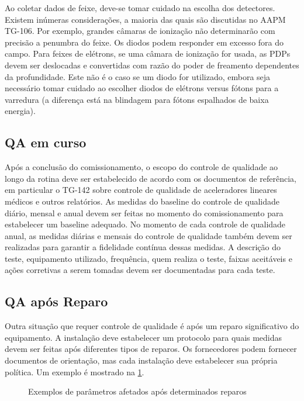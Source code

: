 \documentclass[11pt,a4paper]{article}
\newcounter{exemplo}
\begin{document}
	Ao coletar dados de feixe, deve-se tomar cuidado na escolha dos detectores. Existem inúmeras considerações, a maioria das quais são discutidas no AAPM TG-106. Por exemplo, grandes câmaras de ionização não determinarão com precisão a penumbra do feixe. Os diodos podem responder em excesso fora do campo. Para feixes de elétrons, se uma câmara de ionização for usada, as PDPs devem ser deslocadas e convertidas com razão do poder de freamento dependentes da profundidade. Este não é o caso se um diodo for utilizado, embora seja necessário tomar cuidado ao escolher diodos de elétrons versus fótons para a varredura (a diferença está na blindagem para fótons espalhados de baixa energia).

\subsection*{QA em curso}

	Após a conclusão do comissionamento, o escopo do controle de qualidade ao longo da rotina deve ser estabelecido de acordo com os documentos de referência, em particular o TG-142 sobre controle de qualidade de aceleradores lineares médicos e outros relatórios. As medidas do baseline do controle de qualidade diário, mensal e anual devem ser feitas no momento do comissionamento para estabelecer um baseline adequado. No momento de cada controle de qualidade anual, as medidas diárias e mensais do controle de qualidade também devem ser realizadas para garantir a fidelidade contínua dessas medidas. A descrição do teste, equipamento utilizado, frequência, quem realiza o teste, faixas aceitáveis e ações corretivas a serem tomadas devem ser documentadas para cada teste.

\subsection*{QA após Reparo}

	Outra situação que requer controle de qualidade é após um reparo significativo do equipamento. A instalação deve estabelecer um protocolo para quais medidas devem ser feitas após diferentes tipos de reparos. Os fornecedores podem fornecer documentos de orientação, mas cada instalação deve estabelecer sua própria política. Um exemplo é mostrado na \ref{fig:qaAposReparo}.

	\begin{figure}[!h]
		\centering
		\caption{Exemplos de parâmetros afetados após determinados reparos}
		\label{fig:qaAposReparo}
	\end{figure}
\end{document}
